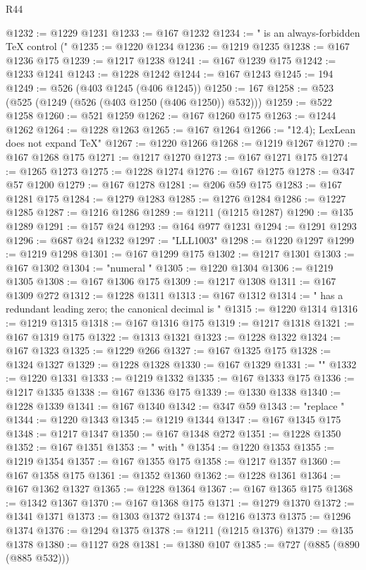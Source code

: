 \begin{lexlean}{R44}
\begin{coremodule}
@1232 := @1229 @1231
@1233 := @167 @1232
@1234 := " is an always-forbidden TeX control ("
@1235 := @1220 @1234
@1236 := @1219 @1235
@1238 := @167 @1236 @175
@1239 := @1217 @1238
@1241 := @167 @1239 @175
@1242 := @1233 @1241
@1243 := @1228 @1242
@1244 := @167 @1243
@1245 := 194
@1249 := @526 (@403 @1245 (@406 @1245))
@1250 := 167
@1258 := @523 (@525 (@1249 (@526 (@403 @1250 (@406 @1250)) @532)))
@1259 := @522 @1258
@1260 := @521 @1259
@1262 := @167 @1260 @175
@1263 := @1244 @1262
@1264 := @1228 @1263
@1265 := @167 @1264
@1266 := "12.4); LexLean does not expand TeX"
@1267 := @1220 @1266
@1268 := @1219 @1267
@1270 := @167 @1268 @175
@1271 := @1217 @1270
@1273 := @167 @1271 @175
@1274 := @1265 @1273
@1275 := @1228 @1274
@1276 := @167 @1275
@1278 := @347 @57 @1200
@1279 := @167 @1278
@1281 := @206 @59 @175
@1283 := @167 @1281 @175
@1284 := @1279 @1283
@1285 := @1276 @1284
@1286 := @1227 @1285
@1287 := @1216 @1286
@1289 := @1211 (@1215 @1287)
@1290 := @135 @1289
@1291 := @157 @24
@1293 := @164 @977 @1231
@1294 := @1291 @1293
@1296 := @687 @24 @1232
@1297 := "LLL1003"
@1298 := @1220 @1297
@1299 := @1219 @1298
@1301 := @167 @1299 @175
@1302 := @1217 @1301
@1303 := @167 @1302
@1304 := "numeral "
@1305 := @1220 @1304
@1306 := @1219 @1305
@1308 := @167 @1306 @175
@1309 := @1217 @1308
@1311 := @167 @1309 @272
@1312 := @1228 @1311
@1313 := @167 @1312
@1314 := " has a redundant leading zero; the canonical decimal is "
@1315 := @1220 @1314
@1316 := @1219 @1315
@1318 := @167 @1316 @175
@1319 := @1217 @1318
@1321 := @167 @1319 @175
@1322 := @1313 @1321
@1323 := @1228 @1322
@1324 := @167 @1323
@1325 := @1229 @266
@1327 := @167 @1325 @175
@1328 := @1324 @1327
@1329 := @1228 @1328
@1330 := @167 @1329
@1331 := ""
@1332 := @1220 @1331
@1333 := @1219 @1332
@1335 := @167 @1333 @175
@1336 := @1217 @1335
@1338 := @167 @1336 @175
@1339 := @1330 @1338
@1340 := @1228 @1339
@1341 := @167 @1340
@1342 := @347 @59
@1343 := "replace "
@1344 := @1220 @1343
@1345 := @1219 @1344
@1347 := @167 @1345 @175
@1348 := @1217 @1347
@1350 := @167 @1348 @272
@1351 := @1228 @1350
@1352 := @167 @1351
@1353 := " with "
@1354 := @1220 @1353
@1355 := @1219 @1354
@1357 := @167 @1355 @175
@1358 := @1217 @1357
@1360 := @167 @1358 @175
@1361 := @1352 @1360
@1362 := @1228 @1361
@1364 := @167 @1362 @1327
@1365 := @1228 @1364
@1367 := @167 @1365 @175
@1368 := @1342 @1367
@1370 := @167 @1368 @175
@1371 := @1279 @1370
@1372 := @1341 @1371
@1373 := @1303 @1372
@1374 := @1216 @1373
@1375 := @1296 @1374
@1376 := @1294 @1375
@1378 := @1211 (@1215 @1376)
@1379 := @135 @1378
@1380 := @1127 @28
@1381 := @1380 @107
@1385 := @727 (@885 (@890 (@885 @532)))

\end{coremodule}
\end{lexlean}
